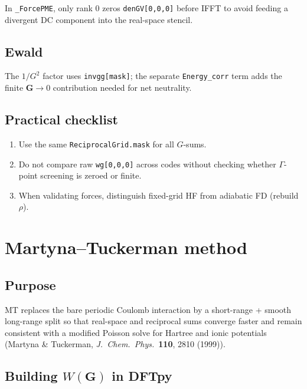 \documentclass[11pt,a4paper]{article}
\begin{document}
In \texttt{\_ForcePME}, only rank 0 zeros \texttt{denGV[0,0,0]} before IFFT to avoid
feeding a divergent DC component into the real-space stencil.

\subsection{Ewald}

The $1/G^2$ factor uses \texttt{invgg[mask]}; the separate \texttt{Energy\_corr} term
adds the finite $\mathbf G\to 0$ contribution needed for net neutrality.

\subsection{Practical checklist}

\begin{enumerate}
  \item Use the same \texttt{ReciprocalGrid.mask} for all $G$-sums.
  \item Do not compare raw \texttt{wg[0,0,0]} across codes without checking whether
        $\Gamma$-point screening is zeroed or finite.
  \item When validating forces, distinguish fixed-grid HF from adiabatic FD (rebuild $\rho$).
\end{enumerate}

\section{Martyna--Tuckerman method}
\label{sec:mt}

\subsection{Purpose}

MT replaces the bare periodic Coulomb interaction by a short-range + smooth long-range split
so that real-space and reciprocal sums converge faster and remain consistent with a
modified Poisson solve for Hartree and ionic potentials (Martyna \& Tuckerman,
\emph{J.\ Chem.\ Phys.}\ \textbf{110}, 2810 (1999)).

\subsection{Building $W(\mathbf G)$ in DFTpy}
\end{document}
